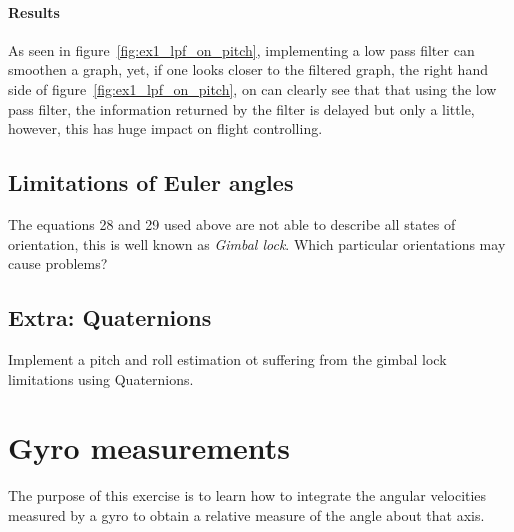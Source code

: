 \documentclass[paper=letter, fontsize=10pt]{article}
\begin{document}
\paragraph{Results} 
As seen in figure~\ref{fig:ex1_lpf_on_pitch}, implementing a low pass filter can smoothen a graph, yet, if one looks closer to the filtered graph, the right hand side of figure~\ref{fig:ex1_lpf_on_pitch}, on can clearly see that that using the low pass filter, the information returned by the filter is delayed but only a little, however, this has huge impact on flight controlling. 

\subsection{Limitations of Euler angles}

The equations 28 and 29 used above are not able to describe all states of orientation, this is well known as \textit{Gimbal lock}. Which particular orientations may cause problems?

\subsection{Extra: Quaternions}

Implement a pitch and roll estimation ot suffering from the gimbal lock limitations using Quaternions.


\section{Gyro measurements}

The purpose of this exercise is to learn how to integrate the angular velocities measured by a gyro to obtain a relative measure of the angle about that axis.
\end{document}
